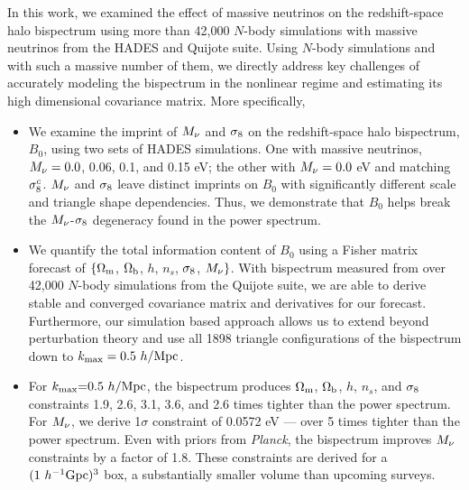 In this work, we examined the effect of massive neutrinos on the redshift-space 
halo bispectrum using more than 42,000 $N$-body simulations with massive neutrinos
from the HADES and Quijote suite. Using $N$-body simulations and with such a massive 
number of them, we directly address key challenges of accurately modeling the 
bispectrum in the nonlinear regime and estimating its high dimensional covariance 
matrix. More specifically, 
\begin{itemize}
    \item We examine the imprint of $M_\nu$ and $\sigma_8$ on the redshift-space halo bispectrum, 
        $B_0$, using two sets of HADES simulations. One with massive neutrinos, $M_\nu = 0.0$, 0.06, 
        0.1, and 0.15 eV; the other with $M_\nu = 0.0$ eV and matching $\sigma_8^{c}$. 
        $M_\nu$ and $\sigma_8$ leave distinct imprints on $B_0$ with significantly different 
        scale and triangle shape dependencies. Thus, we demonstrate that $B_0$ helps 
        break the $M_\nu$-$\sigma_8$ degeneracy found in the power spectrum. 
    \item We quantify the total information content of $B_0$ using a Fisher matrix forecast of 
        $\{\Omega_{\rm m}$, $\Omega_{\rm b}$, $h$, $n_s$, $\sigma_8$, $M_\nu\}$. With bispectrum measured from over 42,000 
        $N$-body simulations from the Quijote suite, we are able to derive stable and converged 
        covariance matrix and derivatives for our forecast. Furthermore, our simulation 
        based approach allows us to extend beyond perturbation theory and use all 1898 
        triangle configurations of the bispectrum down to $k_{\rm max} = 0.5~h/{\rm Mpc}$.
    \item For $k_{\rm max}{=}0.5~h/{\rm Mpc}$, the bispectrum produces $\Omega_{\rm m}$, $\Omega_{\rm b}$, $h$, $n_s$, and 
        $\sigma_8$ constraints 1.9, 2.6, 3.1, 3.6, and 2.6 times tighter than the power spectrum. 
        For $M_\nu$, we derive 1$\sigma$ constraint of 0.0572 eV --- over 5 times tighter than 
        the power spectrum. Even with priors from {\em Planck}, the bispectrum improves 
        $M_\nu$ constraints by a factor of 1.8. These constraints are derived for a 
        $(1~h^{-1}{\rm Gpc})^3$ box, a substantially smaller volume than upcoming surveys.
\end{itemize}

